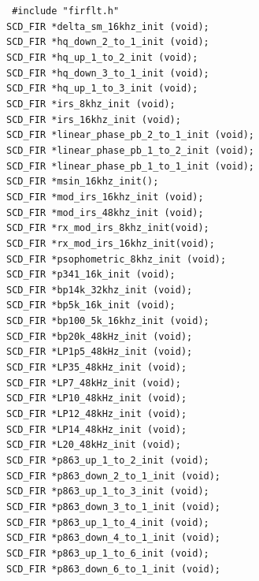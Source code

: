 {\tt
\#include "firflt.h"\\
SCD\_FIR *delta\_sm\_16khz\_init (void);\\
SCD\_FIR *hq\_down\_2\_to\_1\_init (void);\\
SCD\_FIR *hq\_up\_1\_to\_2\_init (void);\\
SCD\_FIR *hq\_down\_3\_to\_1\_init (void);\\
SCD\_FIR *hq\_up\_1\_to\_3\_init (void);\\
SCD\_FIR *irs\_8khz\_init (void);\\
SCD\_FIR *irs\_16khz\_init (void);\\
SCD\_FIR *linear\_phase\_pb\_2\_to\_1\_init (void);\\
SCD\_FIR *linear\_phase\_pb\_1\_to\_2\_init (void);\\
SCD\_FIR *linear\_phase\_pb\_1\_to\_1\_init (void);\\
SCD\_FIR *msin\_16khz\_init();\\
SCD\_FIR *mod\_irs\_16khz\_init (void);\\
SCD\_FIR *mod\_irs\_48khz\_init (void);\\
SCD\_FIR *rx\_mod\_irs\_8khz\_init(void);\\
SCD\_FIR *rx\_mod\_irs\_16khz\_init(void);\\
SCD\_FIR *psophometric\_8khz\_init (void);\\
SCD\_FIR *p341\_16k\_init (void);\\
SCD\_FIR *bp14k\_32khz\_init (void);\\
SCD\_FIR *bp5k\_16k\_init (void);\\
SCD\_FIR *bp100\_5k\_16khz\_init (void);\\
SCD\_FIR *bp20k\_48kHz\_init (void);\\
SCD\_FIR *LP1p5\_48kHz\_init (void);\\
SCD\_FIR *LP35\_48kHz\_init (void);\\
SCD\_FIR *LP7\_48kHz\_init (void);\\
SCD\_FIR *LP10\_48kHz\_init (void);\\
SCD\_FIR *LP12\_48kHz\_init (void);\\
SCD\_FIR *LP14\_48kHz\_init (void);\\
SCD\_FIR *L20\_48kHz\_init (void);\\
SCD\_FIR *p863\_up\_1\_to\_2\_init (void);\\
SCD\_FIR *p863\_down\_2\_to\_1\_init (void);\\
SCD\_FIR *p863\_up\_1\_to\_3\_init (void);\\
SCD\_FIR *p863\_down\_3\_to\_1\_init (void);\\
SCD\_FIR *p863\_up\_1\_to\_4\_init (void);\\
SCD\_FIR *p863\_down\_4\_to\_1\_init (void);\\
SCD\_FIR *p863\_up\_1\_to\_6\_init (void);\\
SCD\_FIR *p863\_down\_6\_to\_1\_init (void);\\
}


